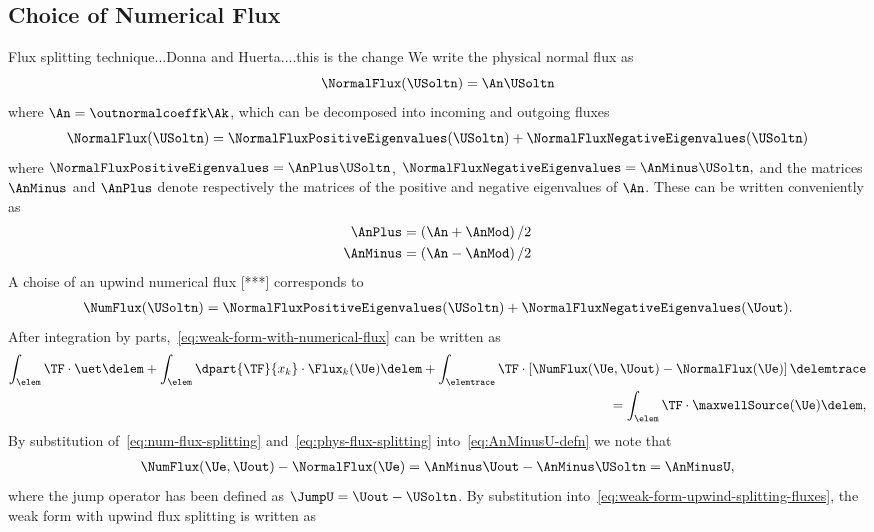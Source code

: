 \subsection{Choice of Numerical Flux}
Flux splitting technique...Donna and Huerta....this is the change
We write the physical normal flux as
$$
\NormalFlux(\USoltn) = \An \USoltn
$$
where $\An = \outnormalcoeffk \Ak$, which can be decomposed into incoming and outgoing fluxes
\begin{align}
\NormalFlux(\USoltn) = \NormalFluxPositiveEigenvalues(\USoltn) + \NormalFluxNegativeEigenvalues(\USoltn)
\label{eq:phys-flux-splitting}
\end{align}
where $ \NormalFluxPositiveEigenvalues = \AnPlus \USoltn$, $\NormalFluxNegativeEigenvalues = \AnMinus \USoltn, $ and the matrices $\AnMinus$ and $\AnPlus$ denote respectively the matrices of the positive and negative eigenvalues of $\An$. These can be written conveniently as
\begin{align}
  \label{eq:AnMinus-AnPlus-Definition}
\AnPlus &= \left( \An + \AnMod \right) / 2   \\
\AnMinus &= \left( \An - \AnMod \right) / 2
\end{align}
A choise of an upwind numerical flux [***] corresponds to
\begin{align}
\NumFlux(\USoltn) = \NormalFluxPositiveEigenvalues(\USoltn) + \NormalFluxNegativeEigenvalues(\Uout).
\label{eq:num-flux-splitting}
\end{align}
After integration by parts,~\eqref{eq:weak-form-with-numerical-flux} can be written as
\begin{align*}
\int_{\elem} \TF \cdot \uet \delem  + \int_{\elem} \dpart{\TF}{x_k} \cdot
\Flux_{k}(\Ue) \delem + \int_{\elemtrace} \TF \cdot \left[ \NumFlux(\Ue,\Uout) - \NormalFlux(\Ue) \right] \delemtrace \\
= \int_{\elem} \TF  \cdot \maxwellSource(\Ue) \delem,
\label{eq:weak-form-upwind-splitting-fluxes}
\end{align*}
By substitution of~\eqref{eq:num-flux-splitting} and~\eqref{eq:phys-flux-splitting} into~\eqref{eq:AnMinusU-defn} we note that
\begin{align*}
  \NumFlux(\Ue,\Uout) - \NormalFlux(\Ue) = \AnMinus \Uout - \AnMinus \USoltn = \AnMinusU,
\end{align*}
where the jump operator has been defined as $\JumpU = \Uout - \USoltn$. By substitution into~\eqref{eq:weak-form-upwind-splitting-fluxes}, the weak form with upwind flux splitting is written as
